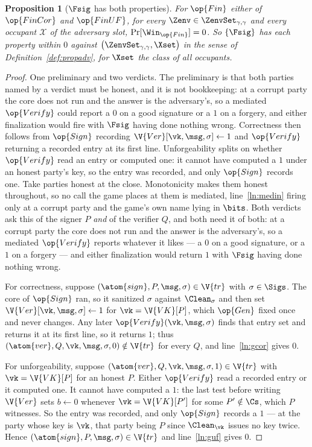\documentclass[10pt,oneside,openany]{book}
\theoremstyle{accentdef}
\theoremstyle{accentplain}
\newtheorem{proposition}[definition]{Proposition}
\begin{document}
\begin{proposition}[$\Fsig$ has both properties]\label{prop:sigprops}
For $\op{Fin}$ either of $\op{FinCor}$ and $\op{FinUF}$, for every
$\Zenv \in \ZenvSet_{\gamma,\gamma}$
and every occupant $\mathcal{X}$ of the adversary slot, $\Pr[\Win_{\op{Fin}}] = 0$. So $\{\Fsig\}$ has
each
property within $0$ against $\bigl(\ZenvSet_{\gamma,\gamma},\Xset\bigr)$ in the sense of
Definition~\ref{def:propadv}, for $\Xset$ the class of all occupants.
\end{proposition}

\begin{proof}
One preliminary and two verdicts. The preliminary is that both parties named by a verdict must be
honest, and it is not bookkeeping: at a corrupt party the core does not run and the answer is the
adversary's, so a mediated $\op{Verify}$ could report a $0$ on a good signature or a $1$ on a
forgery, and either finalization would fire with $\Fsig$ having done nothing wrong. Correctness then
follows from $\op{Sign}$ recording $\V{Ver}[\vk,\msg,\sigma] \gets 1$ and $\op{Verify}$ returning a
recorded entry at its first line. Unforgeability splits on whether $\op{Verify}$ read an entry or
computed one: it cannot have computed a $1$ under an honest party's key, so the entry was recorded,
and only $\op{Sign}$ records one.
Take parties honest at the close. Monotonicity makes them honest throughout, so no call the game
places at them is mediated, line~\ref{ln:medin} firing only at a corrupt party and the game's own name
lying in $\bits$. Both verdicts ask this of the signer $P$ \emph{and} of the verifier $Q$, and both
need it of both: at a corrupt party the core does not run and the answer is the adversary's, so a
mediated $\op{Verify}$ reports whatever it likes --- a $0$ on a good signature, or a $1$ on a
forgery --- and either finalization would return $1$ with $\Fsig$ having done nothing wrong.

For correctness, suppose $(\atom{sign},P,\msg,\sigma) \in \V{tr}$ with $\sigma \in \Sigs$. The core of
$\op{Sign}$ ran, so it sanitized $\sigma$ against $\Clean_{\sigma}$ and then set
$\V{Ver}[\vk,\msg,\sigma] \gets 1$ for $\vk = \V{VK}[P]$, which $\op{Gen}$ fixed once and never
changes. Any later $\op{Verify}(\vk,\msg,\sigma)$ finds that entry set and returns it at its first
line, so it returns $1$; thus $(\atom{ver},Q,\vk,\msg,\sigma,0) \notin \V{tr}$ for every $Q$, and
line~\ref{ln:gcor} gives $0$.

For unforgeability, suppose $(\atom{ver},Q,\vk,\msg,\sigma,1) \in \V{tr}$ with
$\vk = \V{VK}[P]$ for an honest $P$. Either $\op{Verify}$ read a recorded entry or it computed one.
It cannot have computed a $1$: the last test before writing $\V{Ver}$ sets $b \gets 0$ whenever
$\vk = \V{VK}[P']$ for some $P' \notin \Cs$, which $P$ witnesses. So the entry was recorded, and only
$\op{Sign}$ records a $1$ --- at the party whose key is $\vk$, that party being $P$ since
$\Clean_{\vk}$ issues no key twice. Hence $(\atom{sign},P,\msg,\sigma) \in \V{tr}$ and
line~\ref{ln:guf} gives $0$.
\end{proof}
\end{document}
